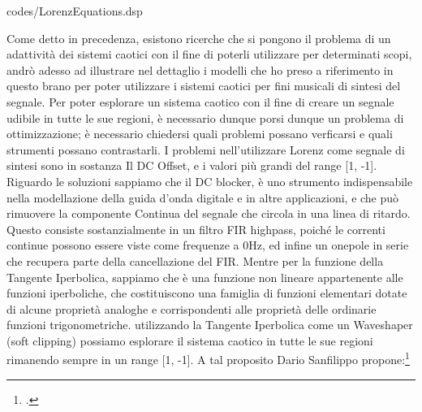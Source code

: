 \vspace{0.5cm} 

{codes/LorenzEquations.dsp}

Come detto in precedenza, esistono ricerche che si pongono il problema 
di un adattività dei sistemi caotici con il fine di poterli utilizzare per determinati scopi,
andrò adesso ad illustrare nel dettaglio i modelli che ho preso a riferimento in questo brano per poter utilizzare
i sistemi caotici per fini musicali di sintesi del segnale. 
Per poter esplorare un sistema caotico con il fine di creare un segnale udibile in tutte le sue regioni, 
è necessario dunque porsi dunque un problema di ottimizzazione;
è necessario chiedersi quali problemi possano verficarsi e quali strumenti possano contrastarli. 
I problemi nell'utilizzare Lorenz come segnale di sintesi 
sono in sostanza Il DC Offset, e i valori più grandi del range [1, -1].
Riguardo le soluzioni sappiamo che il DC blocker, 
è uno strumento indispensabile nella modellazione della guida d’onda
digitale e in altre applicazioni, e che può rimuovere la componente Continua del segnale 
che circola in una linea di ritardo. Questo consiste sostanzialmente in
un filtro FIR highpass, poiché le correnti continue possono essere viste come frequenze a
0Hz, ed infine un onepole in serie che recupera parte della cancellazione del FIR.
Mentre per la funzione della Tangente Iperbolica, sappiamo che è una funzione
non lineare appartenente alle funzioni iperboliche, che costituiscono una famiglia di funzioni 
elementari dotate di alcune proprietà analoghe e corrispondenti alle
proprietà delle ordinarie funzioni trigonometriche.
utilizzando la Tangente Iperbolica come un Waveshaper (soft clipping) possiamo 
esplorare il sistema caotico in tutte le sue regioni rimanendo sempre in un range [1, -1].
A tal proposito Dario Sanfilippo propone:\footcite{sanfilippo_constrained_2021}

